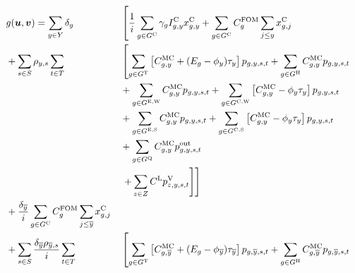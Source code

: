 \documentclass{article}
\begin{document}
\begin{alignat}{3}
	& && g(\bm{u}, \bm{v}) = \sum\limits_{\iYear \in \sYears} \cDiscountRate  &&  \left[\frac{1}{\cInterestRate} \sum\limits_{g\in \sGeneratorsCandidate} \cAmortisationRate  \cCandidateInvestmentCost \vInstalledCapacity + \sum\limits_{\iGenerator \in \sGeneratorsCandidate} \cFixedOperationsMaintenanceCostGenerator \sum\limits_{\iYearAlias \leq \iYear} \vInstalledCapacity[\iGenerator,\iYearAlias] \right. \nonumber\\ 
	& && + \sum\limits_{\iScenario \in \sScenarios} \cScenarioDuration \sum\limits_{\iInterval \in \sIntervals} && \left[\sum\limits_{\iGenerator \in \sGeneratorsThermal} \left[\cMarginalCost + (\cEmissionsIntensity - \vBaseline)\vPermitPrice\right]\vPower  + \sum\limits_{\iGenerator \in \sGeneratorsHydro}\cMarginalCost \vPower \right. \nonumber\\
	& && && + \sum\limits_{\iGenerator \in \sGeneratorsExistingWind} \cMarginalCost \vPower + \sum\limits_{\iGenerator \in \sGeneratorsCandidateWind} \left[\cMarginalCost - \vBaseline \vPermitPrice\right] \vPower \nonumber\\
	& && && + \sum\limits_{\iGenerator \in \sGeneratorsExistingSolar} \cMarginalCost \vPower + \sum\limits_{\iGenerator \in \sGeneratorsCandidateSolar} \left[\cMarginalCost - \vBaseline\vPermitPrice\right] \vPower\nonumber\\
	& && && + \sum\limits_{\iGenerator \in \sStorage} \cMarginalCost \vPowerOut \nonumber\\
	& && && \left.\left. + \sum\limits_{\iZone \in \sZones} \cLostLoadCost \vLostLoadPower \right]\right] \nonumber\\
	& && + \frac{\cDiscountRate[\iYearTerminal]}{\cInterestRate}\sum\limits_{\iGenerator \in \sGeneratorsCandidate} \cFixedOperationsMaintenanceCostGenerator \sum\limits_{\iYearAlias \leq \iYearTerminal} \vInstalledCapacity[\iGenerator,\iYearAlias] \nonumber\\
	& && + \sum\limits_{\iScenario \in \sScenarios} \frac{\cDiscountRate[\iYearTerminal]\cScenarioDuration[\iYearTerminal,\iScenario]}{\cInterestRate} \sum\limits_{\iInterval \in \sIntervals} && \left[\sum\limits_{\iGenerator \in \sGeneratorsThermal} \left[\cMarginalCost[\iGenerator,\iYearTerminal] + (\cEmissionsIntensity - \vBaseline[\iYearTerminal])\vPermitPrice[\iYearTerminal]\right]\vPower[\iGenerator,\iYearTerminal,\iScenario,\iInterval]  + \sum\limits_{\iGenerator \in \sGeneratorsHydro}\cMarginalCost[\iGenerator,\iYearTerminal] \vPower[\iGenerator,\iYearTerminal,\iScenario,\iInterval] \right. \nonumber\\

\end{alignat}
\end{document}
